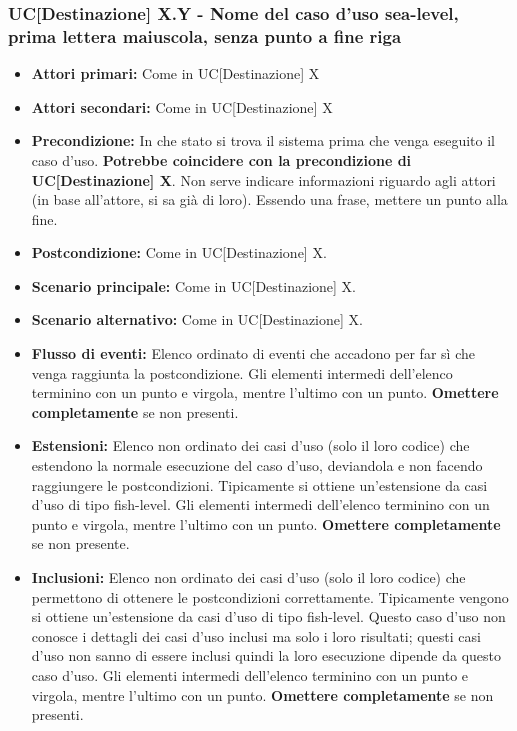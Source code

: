 \documentclass[a4paper, oneside]{article} %
\begin{document}
\subsubsection{UC[Destinazione] X.Y - Nome del caso d'uso sea-level, prima lettera maiuscola, senza punto a fine riga}%
\begin{itemize}
	\item \textbf{Attori primari:} Come in UC[Destinazione] X
	\item \textbf{Attori secondari:} Come in UC[Destinazione] X
	\item \textbf{Precondizione:} In che stato si trova il sistema prima che venga eseguito il caso d'uso. \textbf{Potrebbe coincidere con la precondizione di UC[Destinazione] X}. Non serve indicare informazioni riguardo agli attori (in base all'attore, si sa già di loro). Essendo una frase, mettere un punto alla fine.
	\item \textbf{Postcondizione:} Come in UC[Destinazione] X.
	\item \textbf{Scenario principale:} Come in UC[Destinazione] X.
	\item \textbf{Scenario alternativo:} Come in UC[Destinazione] X.
	\item \textbf{Flusso di eventi:} Elenco ordinato di eventi che accadono per far sì che venga raggiunta la postcondizione. Gli elementi intermedi dell'elenco terminino con un punto e virgola, mentre l'ultimo con un punto. \textbf{Omettere completamente} se non presenti.
	\item \textbf{Estensioni:} Elenco non ordinato dei casi d'uso (solo il loro codice) che estendono la normale esecuzione del caso d'uso, deviandola e non facendo raggiungere le postcondizioni. Tipicamente si ottiene un'estensione da casi d'uso di tipo fish-level. Gli elementi intermedi dell'elenco terminino con un punto e virgola, mentre l'ultimo con un punto. \textbf{Omettere completamente} se non presente.
	\item \textbf{Inclusioni:} Elenco non ordinato dei casi d'uso (solo il loro codice) che permettono di ottenere le postcondizioni correttamente. Tipicamente vengono si ottiene un'estensione da casi d'uso di tipo fish-level. Questo caso d'uso non conosce i dettagli dei casi d'uso inclusi ma solo i loro risultati; questi casi d'uso non sanno di essere inclusi quindi la loro esecuzione dipende da questo caso d'uso. Gli elementi intermedi dell'elenco terminino con un punto e virgola, mentre l'ultimo con un punto.  \textbf{Omettere completamente} se non presenti.
\end{itemize}
\end{document}
